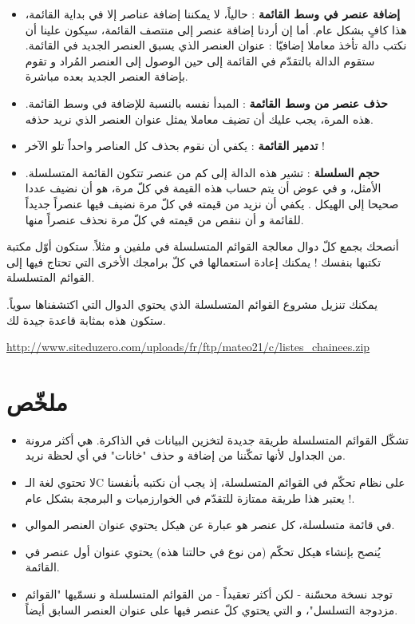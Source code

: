 \begin{itemize}
	\item \textbf{إضافة عنصر في وسط القائمة} :
	حالياً، لا يمكننا إضافة عناصر إلا في بداية القائمة، هذا كافٍ بشكل عام. أما إن أردنا إضافة عنصر إلى منتصف القائمة، سيكون علينا أن نكتب دالة تأخذ معاملا إضافيّا : عنوان العنصر الذي يسبق العنصر الجديد في القائمة. ستقوم الدالة بالتقدّم في القائمة إلى حين الوصول إلى العنصر المُراد و تقوم بإضافة العنصر الجديد بعده مباشرة.
	\item \textbf{حذف عنصر من وسط القائمة} :
	المبدأ نفسه بالنسبة للإضافة في وسط القائمة. هذه المرة، يجب عليك أن تضيف معاملا يمثل عنوان العنصر الذي نريد حذفه.
	\item \textbf{تدمير القائمة} :
	يكفي أن نقوم بحذف كل العناصر واحداً تلو الآخر !
	\item \textbf{حجم السلسلة} :
	تشير هذه الدالة إلى كم من عنصر تتكون القائمة المتسلسلة. الأمثل، و في عوض أن يتم حساب هذه القيمة في كلّ مرة، هو أن نضيف عددا صحيحا
	إلى الهيكل
	.
	يكفي أن نزيد من قيمته في كلّ مرة نضيف فيها عنصراً جديداً للقائمة و أن ننقص من قيمته في كلّ مرة نحذف عنصراً منها.
\end{itemize}

أنصحك بجمع كلّ دوال معالجة القوائم المتسلسلة في ملفين 
و
مثلاً. ستكون أوّل مكتبة تكتبها بنفسك ! يمكنك إعادة استعمالها في كلّ برامجك الأخرى التي تحتاج فيها إلى القوائم المتسلسلة.

يمكنك تنزيل مشروع القوائم المتسلسلة الذي يحتوي الدوال التي اكتشفناها سوياً. ستكون هذه بمثابة قاعدة جيدة لك.

\url{http://www.siteduzero.com/uploads/fr/ftp/mateo21/c/listes_chainees.zip}

\section*{ملخّص}

\begin{itemize}
	\item تشكّل القوائم المتسلسلة طريقة جديدة لتخزين البيانات في الذاكرة. هي أكثر مرونة من الجداول لأنها تمكّننا من إضافة و حذف "خانات" في أي لحظة نريد.
	\item لا تحتوي لغة الـ\textenglish{C}
	على نظام تحكّم في القوائم المتسلسلة، إذ يجب أن نكتبه بأنفسنا ! يعتبر هذا طريقة ممتازة للتقدّم في الخوارزميات و البرمجة بشكل عام.
	\item في قائمة متسلسلة، كل عنصر هو عبارة عن هيكل يحتوي عنوان العنصر الموالي.
	\item يُنصح بإنشاء هيكل تحكّم (من نوع
	في حالتنا هذه) يحتوي عنوان أول عنصر في القائمة.
	\item توجد نسخة محسّنة - لكن أكثر تعقيداً - من القوائم المتسلسلة و نسمّيها "القوائم مزدوجة التسلسل"، و التي يحتوي كلّ عنصر فيها على عنوان العنصر السابق أيضاً.
\end{itemize}

